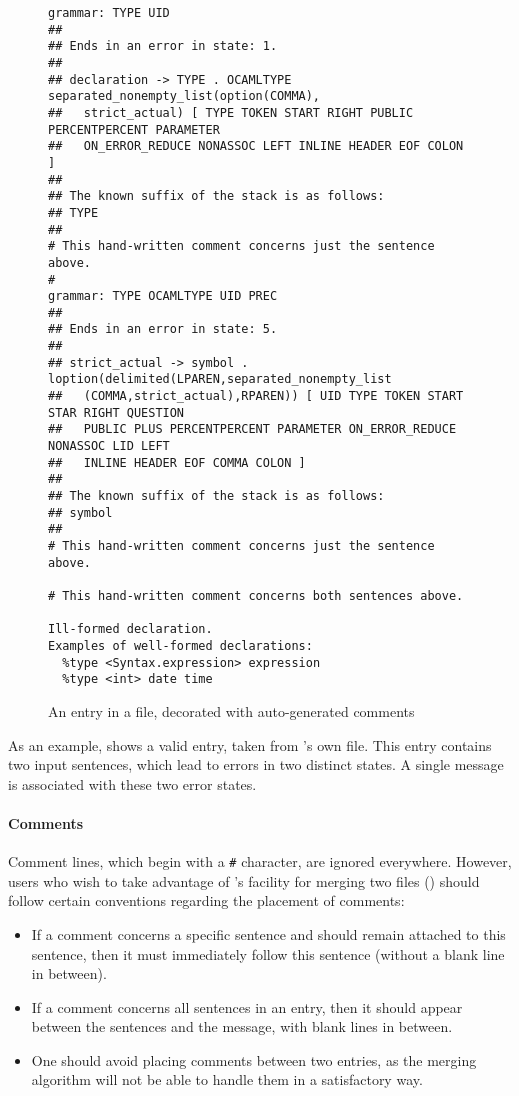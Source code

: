 \documentclass[onecolumn,11pt,nocopyrightspace,preprint]{sigplanconf}
\begin{document}
\begin{figure}
\begin{verbatim}
grammar: TYPE UID
##
## Ends in an error in state: 1.
##
## declaration -> TYPE . OCAMLTYPE separated_nonempty_list(option(COMMA),
##   strict_actual) [ TYPE TOKEN START RIGHT PUBLIC PERCENTPERCENT PARAMETER
##   ON_ERROR_REDUCE NONASSOC LEFT INLINE HEADER EOF COLON ]
##
## The known suffix of the stack is as follows:
## TYPE
##
# This hand-written comment concerns just the sentence above.
#
grammar: TYPE OCAMLTYPE UID PREC
##
## Ends in an error in state: 5.
##
## strict_actual -> symbol . loption(delimited(LPAREN,separated_nonempty_list
##   (COMMA,strict_actual),RPAREN)) [ UID TYPE TOKEN START STAR RIGHT QUESTION
##   PUBLIC PLUS PERCENTPERCENT PARAMETER ON_ERROR_REDUCE NONASSOC LID LEFT
##   INLINE HEADER EOF COMMA COLON ]
##
## The known suffix of the stack is as follows:
## symbol
##
# This hand-written comment concerns just the sentence above.

# This hand-written comment concerns both sentences above.

Ill-formed declaration.
Examples of well-formed declarations:
  %type <Syntax.expression> expression
  %type <int> date time
\end{verbatim}
\caption{An entry in a \messages file, decorated with auto-generated comments}
\label{fig:messages:entry:decorated}
\end{figure}

As an example,  shows a valid entry, taken
from \menhir's own \messages file. This entry contains two input sentences,
which lead to errors in two distinct states. A single message is associated
with these two error states.

\paragraph{Comments}

Comment lines, which begin with a \verb+#+ character, are ignored everywhere.
However, users who wish to take advantage of \menhir's facility for merging
two \messages files () should follow certain
conventions regarding the placement of comments:
\begin{itemize}
\item If a comment concerns a specific sentence and should remain attached
  to this sentence, then it must immediately follow this sentence
  (without a blank line in between).
\item If a comment concerns all sentences in an entry, then it should appear
  between the sentences and the message, with blank lines in between.
\item One should avoid placing comments between two entries, as the merging
  algorithm will not be able to handle them in a satisfactory way.
\end{itemize}
\end{document}
